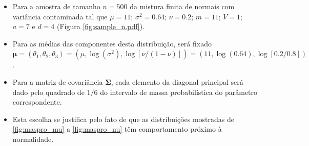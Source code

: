 \documentclass[9pt]{beamer}
\begin{document}
\begin{frame}
\begin{itemize}
\justifying	
\item Para a amostra de tamanho $n=500$ da mistura finita de normais com variância contaminada tal que $\mu = 11$; $\sigma^2 = 0.64$; $\nu = 0.2$; $m = 11$; $V = 1$; $a = 7$ e $d = 4$ (Figura \ref{fig:sample_n.pdf}).

\item Para as médias das componentes desta distribuição, será fixado $\bm{\mu} = (\theta_1, \theta_2, \theta_3) = (\mu, \log(\sigma^2), \log[\nu/(1-\nu)]) = (11, \log(0.64), \log[0.2/0.8])$.
\item Para a matriz de covariância $\bm{\Sigma}$, cada elemento da diagonal principal será dado pelo quadrado de $1/6$ do intervalo de massa probabilística do parâmetro correspondente.

\item Esta escolha se justifica pelo fato de que as distribuições mostradas de \ref{fig:maspro_mu} a \ref{fig:maspro_nu} têm comportamento próximo à normalidade.
\end{itemize}
\end{frame}
\end{document}
